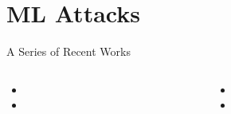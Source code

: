 \documentclass[table,10pt,aspectratio=169]{beamer}
\begin{document}
\section{ML Attacks}
\label{sec:orgdda7ea7}
\begin{frame}[label={sec:org046a156}]{A Series of Recent Works}
\begin{columns}
\begin{column}[t]{0.5\columnwidth}
{\footnotesize

\begin{itemize}
\item {}
\item {}
\end{itemize}

\par}
\end{column}

\begin{column}[t]{0.5\columnwidth}
{\footnotesize

\begin{itemize}
\item {}
\item {}
\end{itemize}

\par}
\end{column}
\end{columns}
\end{frame}
\end{document}
